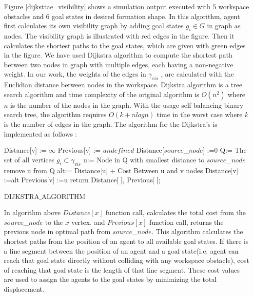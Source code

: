 Figure \ref{dijksttae_visibility} shows a simulation output executed with 5 workspace obstacles and 6 goal states in desired formation shape. In this algorithm, agent first calculates its own visibility graph by adding goal states $g_i \in G$ in graph as nodes. The visibility graph is illustrated with red edges in the figure. Then it calculates the shortest paths to the goal states, which are given with green edges in the figure. We have used Dijkstra algorithm to compute the shortest path between two nodes in graph with multiple edges, each having a non-negative weight. In our work, the weights of the edges in $\gamma_{vis}$ , are calculated with the Euclidian distance between nodes in the workspace. Dijkstra algorithm is a tree search algorithm and time complexity of the original algorithm is $O(n^2)$ where $n$ is the number of the nodes in the graph. With the usage self balancing binary search tree, the algorithm requires $O(k+nlogn)$ time in the worst case where $k$ is the number of edges in the graph. The algorithm for the Dijkstra's is implemented as follows \cite{92}:
\newpage
	
\begin{algorithm}[H]
{		
Distance[v] := $\infty$ \;
Previous[v] := $undefined$ \;
}
Distance[$source$\_$ node$] :=0  \;
Q:= The set of all vertices $g_i \subset \gamma_{vis}$ \;
{
u:= Node in Q with smallest distance to $source$\_$ node$\;
remove u from Q\;
{
alt:= Distance[u] + Cost Between u and v nodes\;
{
Distance[v] :=alt\;
Previous[v] :=u\;
}
}
}
return Distance[ ], Previous[ ]; \newline
\caption{DIJKSTRA$\_$ALGORITHM}
\end{algorithm}

In algorithm above $Distance[x]$ function call, calculates the total cost from the \\ $source$\_$ node$ to the $x$ vertex, and $Previous[x]$ function call, returns the previous node in optimal path from $source$\_$ node$. This algorithm calculates the shortest paths from the position of an agent to all available goal states. If there is a line segment between the position of an agent and a goal state(i.e. agent can reach that goal state directly without colliding with any workspace obstacle), cost of reaching that goal state is the length of that line segment. These cost values are used to assign the agents to the goal states by minimizing the total displacement.  

